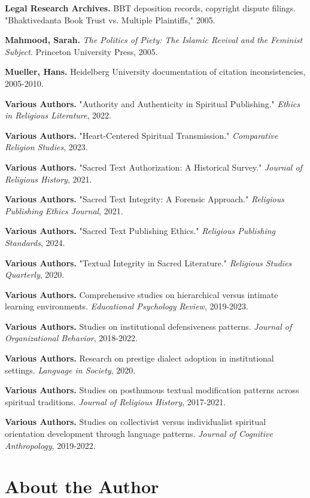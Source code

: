 \documentclass[11pt,twoside]{book}
\begin{document}
\textbf{\textbf{Legal Research Archives.}} BBT deposition records, copyright dispute filings. "Bhaktivedanta Book Trust vs. Multiple Plaintiffs," 2005.

\textbf{\textbf{Mahmood, Sarah.}} \emph{The Politics of Piety: The Islamic Revival and the Feminist Subject}. Princeton University Press, 2005.

\textbf{\textbf{Mueller, Hans.}} Heidelberg University documentation of citation inconsistencies, 2005-2010.

\textbf{\textbf{Various Authors.}} "Authority and Authenticity in Spiritual Publishing." \emph{Ethics in Religious Literature}, 2022.

\textbf{\textbf{Various Authors.}} "Heart-Centered Spiritual Transmission." \emph{Comparative Religion Studies}, 2023.

\textbf{\textbf{Various Authors.}} "Sacred Text Authorization: A Historical Survey." \emph{Journal of Religious History}, 2021.

\textbf{\textbf{Various Authors.}} "Sacred Text Integrity: A Forensic Approach." \emph{Religious Publishing Ethics Journal}, 2021.

\textbf{\textbf{Various Authors.}} "Sacred Text Publishing Ethics." \emph{Religious Publishing Standards}, 2024.

\textbf{\textbf{Various Authors.}} "Textual Integrity in Sacred Literature." \emph{Religious Studies Quarterly}, 2020.

\textbf{\textbf{Various Authors.}} Comprehensive studies on hierarchical versus intimate learning environments. \emph{Educational Psychology Review}, 2019-2023.

\textbf{\textbf{Various Authors.}} Studies on institutional defensiveness patterns. \emph{Journal of Organizational Behavior}, 2018-2022.

\textbf{\textbf{Various Authors.}} Research on prestige dialect adoption in institutional settings. \emph{Language in Society}, 2020.

\textbf{\textbf{Various Authors.}} Studies on posthumous textual modification patterns across spiritual traditions. \emph{Journal of Religious History}, 2017-2021.

\textbf{\textbf{Various Authors.}} Studies on collectivist versus individualist spiritual orientation development through language patterns. \emph{Journal of Cognitive Anthropology}, 2019-2022.
\part*{About the Author}
\label{sec:org7b2fef5}
\end{document}
